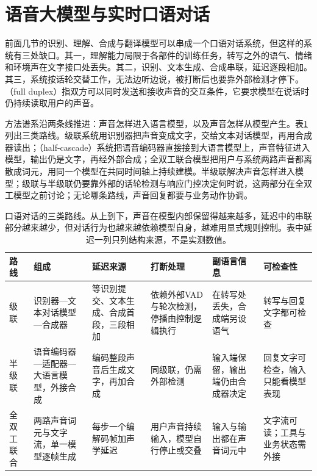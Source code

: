 \section{语音大模型与实时口语对话}
\label{sec:nlp-speech-realtime-dialogue}

前面几节的识别、理解、合成与翻译模型可以串成一个口语对话系统，但这样的系统有三处缺口。其一，理解能力局限于各部件的训练任务，转写之外的语气、情绪和环境声在文字接口处丢失。其二，识别、文本生成、合成串联，延迟逐段相加。其三，系统按话轮交替工作，无法边听边说，被打断后也要靠外部检测才停下。（full duplex）指双方可以同时发送和接收声音的交互条件，它要求模型在说话时仍持续读取用户的声音。

方法谱系沿两条线推进：声音怎样进入语言模型，以及声音怎样从模型产生。表\ref{tab:nlp-speech-dialogue-routes}列出三类路线。级联系统用识别器把声音变成文字，交给文本对话模型，再用合成器读出；（half-cascade）系统把语音编码器直接接到大语言模型上，声音特征进入模型，输出仍是文字，再经外部合成；全双工联合模型把用户与系统两路声音都离散成词元，用同一个模型在共同时间轴上持续建模。半级联解决声音怎样进入模型；级联与半级联仍要靠外部的话轮检测与响应门控决定何时说，这两部分在全双工模型之前讨论；无论哪条路线，声音回复都要与业务动作协调。

\begin{table}[htbp]
  \centering
  \begin{tabularx}{\linewidth}{@{}>{\raggedright\arraybackslash}p{20mm}>{\raggedright\arraybackslash}p{30mm}>{\raggedright\arraybackslash}X>{\raggedright\arraybackslash}X>{\raggedright\arraybackslash}X>{\raggedright\arraybackslash}X@{}}
    \toprule
    路线 & 组成 & 延迟来源 & 打断处理 & 副语言信息 & 可检查性\\
    \midrule
    级联 & 识别器—文本对话模型—合成器 & 等识别提交、文本生成、合成首段，三段相加 & 依赖外部VAD与轮次检测，停播由控制逻辑执行 & 在转写处丢失，合成端另设语气 & 转写与回复文字都可检查\\
    半级联 & 语音编码器—适配器—大语言模型，外接合成 & 编码整段声音后生成文字，再加合成 & 同级联，仍需外部检测 & 输入端保留，输出端仍由合成器决定 & 回复文字可检查，输入只能看模型表现\\
    全双工联合 & 两路声音词元与文字流，单一模型逐帧生成 & 每步一个编解码帧加声学延迟 & 用户声音持续输入，模型自行停止或交叠 & 输入与输出都在声音词元中 & 文字流可读；工具与业务状态需外接\\
    \bottomrule
  \end{tabularx}
  \caption{口语对话的三类路线。从上到下，声音在模型内部保留得越来越多，延迟中的串联部分越来越少，但对话行为也越来越依赖模型自身，越难用显式规则控制。表中延迟一列只列结构来源，不是实测数值。}
  \label{tab:nlp-speech-dialogue-routes}
\end{table}

